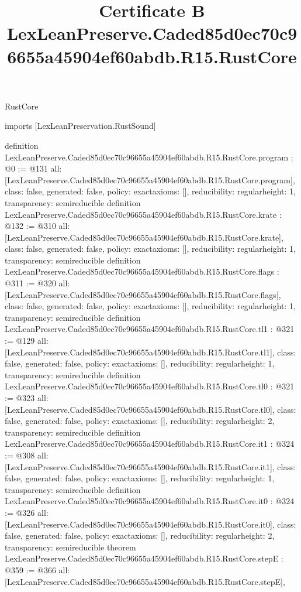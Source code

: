\begin{lexlean}{RustCore}
\title{Certificate B LexLeanPreserve.Caded85d0ec70c96655a45904ef60abdb.R15.RustCore}
\begin{coremodule}
imports [LexLeanPreservation.RustSound]

definition LexLeanPreserve.Caded85d0ec70c96655a45904ef60abdb.R15.RustCore.program : @0 := @131 {
  all: [LexLeanPreserve.Caded85d0ec70c96655a45904ef60abdb.R15.RustCore.program],
  class: false,
  generated: false,
  policy: exact{axioms: []},
  reducibility: regular{height: 1},
  transparency: semireducible
}
definition LexLeanPreserve.Caded85d0ec70c96655a45904ef60abdb.R15.RustCore.krate : @132 := @310 {
  all: [LexLeanPreserve.Caded85d0ec70c96655a45904ef60abdb.R15.RustCore.krate],
  class: false,
  generated: false,
  policy: exact{axioms: []},
  reducibility: regular{height: 1},
  transparency: semireducible
}
definition LexLeanPreserve.Caded85d0ec70c96655a45904ef60abdb.R15.RustCore.flags : @311 := @320 {
  all: [LexLeanPreserve.Caded85d0ec70c96655a45904ef60abdb.R15.RustCore.flags],
  class: false,
  generated: false,
  policy: exact{axioms: []},
  reducibility: regular{height: 1},
  transparency: semireducible
}
definition LexLeanPreserve.Caded85d0ec70c96655a45904ef60abdb.R15.RustCore.tl1 : @321 := @129 {
  all: [LexLeanPreserve.Caded85d0ec70c96655a45904ef60abdb.R15.RustCore.tl1],
  class: false,
  generated: false,
  policy: exact{axioms: []},
  reducibility: regular{height: 1},
  transparency: semireducible
}
definition LexLeanPreserve.Caded85d0ec70c96655a45904ef60abdb.R15.RustCore.tl0 : @321 := @323 {
  all: [LexLeanPreserve.Caded85d0ec70c96655a45904ef60abdb.R15.RustCore.tl0],
  class: false,
  generated: false,
  policy: exact{axioms: []},
  reducibility: regular{height: 2},
  transparency: semireducible
}
definition LexLeanPreserve.Caded85d0ec70c96655a45904ef60abdb.R15.RustCore.it1 : @324 := @308 {
  all: [LexLeanPreserve.Caded85d0ec70c96655a45904ef60abdb.R15.RustCore.it1],
  class: false,
  generated: false,
  policy: exact{axioms: []},
  reducibility: regular{height: 1},
  transparency: semireducible
}
definition LexLeanPreserve.Caded85d0ec70c96655a45904ef60abdb.R15.RustCore.it0 : @324 := @326 {
  all: [LexLeanPreserve.Caded85d0ec70c96655a45904ef60abdb.R15.RustCore.it0],
  class: false,
  generated: false,
  policy: exact{axioms: []},
  reducibility: regular{height: 2},
  transparency: semireducible
}
theorem LexLeanPreserve.Caded85d0ec70c96655a45904ef60abdb.R15.RustCore.stepE : @359 := @366 {
  all: [LexLeanPreserve.Caded85d0ec70c96655a45904ef60abdb.R15.RustCore.stepE],
}
\end{coremodule}
\end{lexlean}
